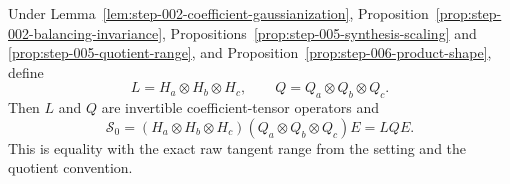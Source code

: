 \begin{proposition}
\label{prop:step-006-exact-equivariance}
Under Lemma~\ref{lem:step-002-coefficient-gaussianization}, Proposition~\ref{prop:step-002-balancing-invariance}, Propositions~\ref{prop:step-005-synthesis-scaling} and
\ref{prop:step-005-quotient-range}, and
Proposition~\ref{prop:step-006-product-shape}, define
\begin{equation}
  L=H_a\otimes H_b\otimes H_c,
  \qquad Q=Q_a\otimes Q_b\otimes Q_c.                         \label{eq:step-006-22}
\end{equation}
Then \(L\) and \(Q\) are invertible coefficient-tensor operators and
\begin{equation}
  \boxed{
  \mathscr S_0
  =(H_a\otimes H_b\otimes H_c)
   (Q_a\otimes Q_b\otimes Q_c)E
  =LQE.}                                                       \label{eq:step-006-23}
\end{equation}
This is equality with the exact raw tangent range from the setting and the
quotient convention.

\end{proposition}

